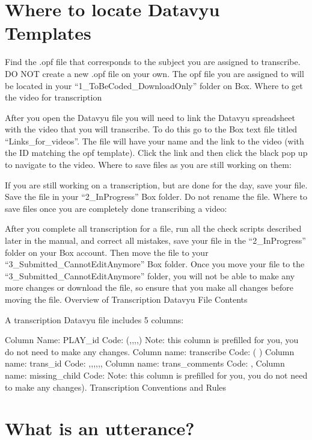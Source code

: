 \documentclass[
  12pt,
]{book}
\begin{document}
\hypertarget{where-to-locate-datavyu-templates}{%
\section{Where to locate Datavyu Templates}\label{where-to-locate-datavyu-templates}}

Find the .opf file that corresponds to the subject you are assigned to transcribe. DO NOT create a new .opf file on your own. The opf file you are assigned to will be located in your ``1\_ToBeCoded\_DownloadOnly'' folder on Box.
Where to get the video for transcription

After you open the Datavyu file you will need to link the Datavyu spreadsheet with the video that you will transcribe. To do this go to the Box text file titled ``Links\_for\_videos''. The file will have your name and the link to the video (with the ID matching the opf template). Click the link and then click the black pop up to navigate to the video.
Where to save files as you are still working on them:

If you are still working on a transcription, but are done for the day, save your file. Save the file in your ``2\_InProgress'' Box folder. Do not rename the file.
Where to save files once you are completely done transcribing a video:

After you complete all transcription for a file, run all the check scripts described later in the manual, and correct all mistakes, save your file in the ``2\_InProgress'' folder on your Box account. Then move the file to your ``3\_Submitted\_CannotEditAnymore'' Box folder.
Once you move your file to the ``3\_Submitted\_CannotEditAnymore'' folder, you will not be able to make any more changes or download the file, so ensure that you make all changes before moving the file.
Overview of Transcription Datavyu File Contents

A transcription Datavyu file includes 5 columns:

Column Name: PLAY\_id
Code: (,,,,)
Note: this column is prefilled for you, you do not need to make any changes.
Column name: transcribe
Code: ( )
Column name: trans\_id
Code: ,,,,,,
Column name: trans\_comments
Code: ,
Column name: missing\_child
Code:
Note: this column is prefilled for you, you do not need to make any changes).
Transcription Conventions and Rules

\hypertarget{what-is-an-utterance}{%
\section{What is an utterance?}\label{what-is-an-utterance}}
\end{document}
